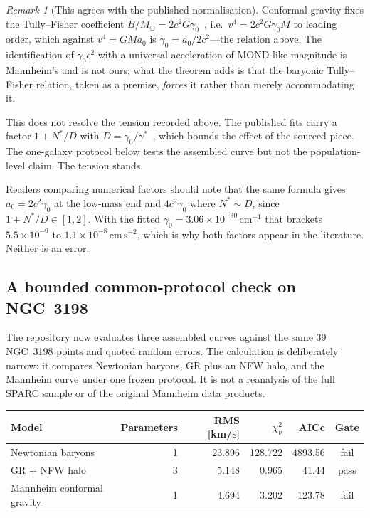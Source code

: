 \documentclass[11pt]{article}
\theoremstyle{definition}
\theoremstyle{remark}
\newtheorem{remark}[theorem]{Remark}
\begin{document}
\begin{remark}[This agrees with the published normalisation]
Conformal gravity fixes the Tully--Fisher coefficient
\(B/M_{\odot}=2c^{2}G\gamma_{0}\)~\cite{OBrien2018}, i.e.\
\(v^{4}=2c^{2}G\gamma_{0}M\) to leading order, which against
\(v^{4}=GMa_{0}\) is \(\gamma_{0}=a_{0}/2c^{2}\)---the relation above.  The
identification of \(\gamma_{0}c^{2}\) with a universal acceleration of
MOND-like magnitude is Mannheim's and is not ours; what the theorem adds is
that the baryonic Tully--Fisher relation, taken as a premise, \emph{forces}
it rather than merely accommodating it.

This does not resolve the tension recorded above.  The published fits carry a
factor \(1+N^{*}/D\) with \(D=\gamma_{0}/\gamma^{*}\)~\cite{OBrien2018},
which bounds the effect of the sourced piece.  The one-galaxy protocol below
tests the assembled curve but not the population-level claim.  The tension
stands.

Readers comparing numerical factors should note that the same formula gives
\(a_{0}=2c^{2}\gamma_{0}\) at the low-mass end and \(4c^{2}\gamma_{0}\)
where \(N^{*}\sim D\), since \(1+N^{*}/D\in[1,2]\).  With the fitted
\(\gamma_{0}=3.06\times10^{-30}\,\mathrm{cm}^{-1}\) that brackets
\(5.5\times10^{-9}\) to \(1.1\times10^{-8}\,\mathrm{cm\,s^{-2}}\), which
is why both factors appear in the literature.  Neither is an error.
\end{remark}

\subsection*{A bounded common-protocol check on NGC~3198}

The repository now evaluates three assembled curves against the same 39
NGC~3198 points and quoted random errors.  The calculation is deliberately
narrow: it compares Newtonian baryons, GR plus an NFW halo, and the Mannheim
curve under one frozen protocol.  It is not a reanalysis of the full SPARC
sample or of the original Mannheim data products.

\begin{center}
\begin{tabularx}{\textwidth}{@{}Yrrrrc@{}}
\toprule
Model & Parameters & RMS [km/s] & \(\chi^2_\nu\) & AICc & Gate \\
\midrule
Newtonian baryons & 1 & 23.896 & 128.722 & 4893.56 & fail \\
GR + NFW halo & 3 & 5.148 & 0.965 & 41.44 & pass \\
Mannheim conformal gravity & 1 & 4.694 & 3.202 & 123.78 & fail \\
\bottomrule
\end{tabularx}
\end{center}
\end{document}
